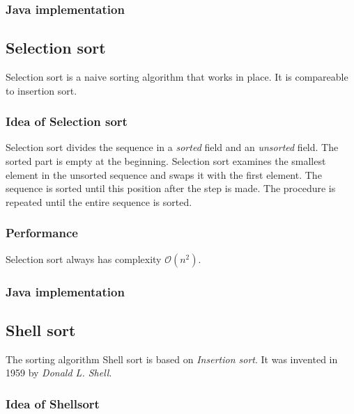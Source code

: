 \documentclass[]{pfBook}
\newcommand{\OO}{\mathcal{O}}
\begin{document}
	\subsubsection{Java implementation}
	
	
	
	\subsection{Selection sort}
	
	Selection sort is a naive sorting algorithm that works in place. It is compareable to insertion sort.
	
	\subsubsection{Idea of Selection sort}
	
	Selection sort divides the sequence in a \emph{sorted} field and an \emph{unsorted} field. The sorted part is empty at the beginning. Selection sort examines the smallest element in the unsorted sequence and swaps it with the first element. The sequence is sorted until this position after the step is made. The procedure is repeated until the entire sequence is sorted.
	
	\subsubsection{Performance}
	
	Selection sort always has complexity $\OO(n^2)$.
	
	\subsubsection{Java implementation}
	
	
	
	\subsection{Shell sort}
	
	The sorting algorithm Shell sort is based on \emph{Insertion sort}. It was invented in 1959 by \emph{Donald L. Shell}.
	
	\subsubsection{Idea of Shellsort}
	
\end{document}
